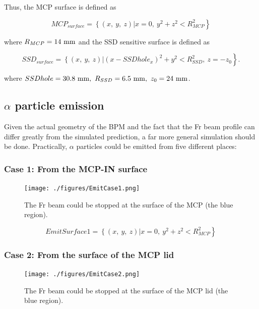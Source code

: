 \documentclass{article}
\begin{document}
Thus, the MCP surface is defined as

$$
MCP_{surface} = \left\{ (x,~y,~z) \right| \left. x = 0,~y^2 + z^2 < R_{MCP}^2 \right\}
$$

where $R_{MCP} = 14~{\rm mm}$ and the SSD sensitive surface is defined as

$$
SSD_{surface} = \left\{ (x,~y,~z) \right| \left. (x - SSDhole_x)^2 + y^2 < R_{SSD}^2,~z = -z_0 \right\}.
$$

where $SSDhole = 30.8~{\rm mm},~R_{SSD} = 6.5~{\rm mm},~z_0 = 24~{\rm mm}$.



\subsection{$\alpha$ particle emission}

Given the actual geometry of the BPM and the fact that the Fr beam profile can differ greatly from the simulated prediction, a far more general simulation should be done. Practically, $\alpha$ particles could be emitted from five different places:

\subsubsection{Case 1: From the MCP-IN surface}

\begin{figure}[H]
  \begin{center}
    \texttt{[image: ./figures/EmitCase1.png]}
	  \caption{The Fr beam could be stopped at the surface of the MCP (the blue region).}
    \label{fig:EmitCase1}
  \end{center}
\end{figure}

$$
EmitSurface1 = \left\{ (x,~y,~z) \right| \left. x = 0,~y^2+z^2 < R_{MCP}^2 \right\}
$$

\subsubsection{Case 2: From the surface of the MCP lid}

\begin{figure}[H]
  \begin{center}
    \texttt{[image: ./figures/EmitCase2.png]}
	  \caption{The Fr beam could be stopped at the surface of the MCP lid (the blue region).}
    \label{fig:EmitCase2}
  \end{center}
\end{figure}
\end{document}
